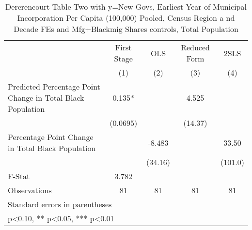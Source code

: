 \begin{table}[htbp]\centering
\def\sym#1{\ifmmode^{#1}\else\(^{#1}\)\fi}
\caption{Dererencourt Table Two with y=New Govs, Earliest Year of Municipal Incorporation Per Capita (100,000) Pooled, Census Region a nd Decade FEs and Mfg+Blackmig Shares controls, Total Population}
\begin{tabular}{l*{4}{c}}
\toprule
                    & First Stage   &         OLS   &Reduced Form   &        2SLS   \\
                    &\multicolumn{1}{c}{(1)}   &\multicolumn{1}{c}{(2)}   &\multicolumn{1}{c}{(3)}   &\multicolumn{1}{c}{(4)}   \\
\midrule
Predicted Percentage Point Change in Total Black Population&       0.135*  &               &       4.525   &               \\
                    &    (0.0695)   &               &     (14.37)   &               \\
\addlinespace
Percentage Point Change in Total Black Population&               &      -8.483   &               &       33.50   \\
                    &               &     (34.16)   &               &     (101.0)   \\
\midrule
F-Stat              &       3.782   &               &               &               \\
Observations        &          81   &          81   &          81   &          81   \\
\bottomrule
\multicolumn{5}{l}{\footnotesize Standard errors in parentheses}\\
\multicolumn{5}{l}{\footnotesize * p<0.10, ** p<0.05, *** p<0.01}\\
\end{tabular}
\end{table}
